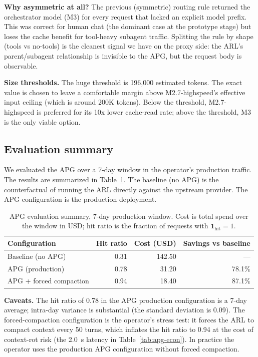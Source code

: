 \noindent
\textbf{Why asymmetric at all?} The previous (symmetric) routing
rule returned the orchestrator model (M3) for every request that
lacked an explicit model prefix. This was correct for human chat
(the dominant case at the prototype stage) but loses the cache
benefit for tool-heavy subagent traffic. Splitting the rule by
shape (tools vs no-tools) is the cleanest signal we have on the
proxy side: the ARL's parent/subagent relationship is invisible to
the APG, but the request body is observable.

\noindent
\textbf{Size thresholds.} The huge threshold is 196,000 estimated
tokens. The exact value is chosen to leave a comfortable margin
above M2.7-highspeed's effective input ceiling (which is around
200K tokens). Below the threshold, M2.7-highspeed is preferred
for its 10x lower cache-read rate; above the threshold, M3 is the
only viable option.

\subsection{Evaluation summary}
\label{app:apg:eval}

We evaluated the APG over a 7-day window in the operator's
production traffic. The results are summarized in
Table~\ref{tab:apg-eval}. The baseline (no APG) is the
counterfactual of running the ARL directly against the upstream
provider. The APG configuration is the production deployment.

\begin{table}[ht]
\centering
\caption{APG evaluation summary, 7-day production window. Cost is
total spend over the window in USD; hit ratio is the fraction of
requests with $\mathbf{1}_{\text{hit}} = 1$.}
\label{tab:apg-eval}
\begin{tabular}{lrrr}
\toprule
\textbf{Configuration} & \textbf{Hit ratio} & \textbf{Cost (USD)} & \textbf{Savings vs baseline} \\
\midrule
Baseline (no APG)    & 0.31 & 142.50 & --- \\
APG (production)     & 0.78 &  31.20 & 78.1\% \\
APG + forced compaction & 0.94 &  18.40 & 87.1\% \\
\bottomrule
\end{tabular}
\end{table}

\noindent
\textbf{Caveats.} The hit ratio of 0.78 in the APG production
configuration is a 7-day average; intra-day variance is substantial
(the standard deviation is 0.09). The forced-compaction
configuration is the operator's stress test: it forces the ARL to
compact context every 50 turns, which inflates the hit ratio to
0.94 at the cost of context-rot risk (the 2.0~s latency in
Table~\ref{tab:apg-econ}). In practice the operator uses the
production APG configuration without forced compaction.

